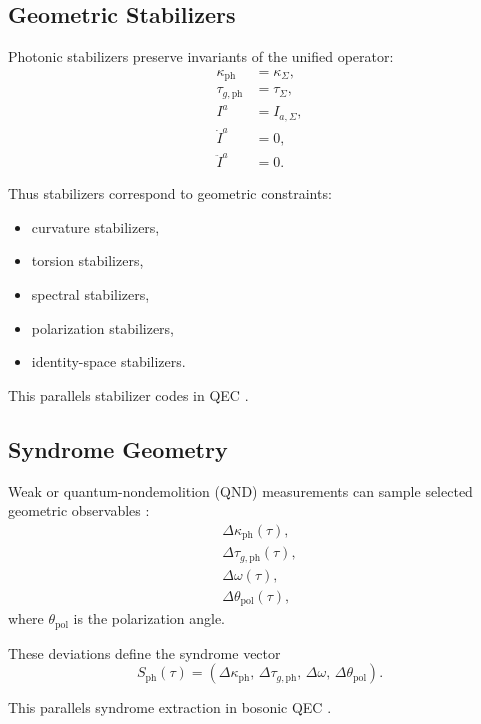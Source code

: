 \documentclass[aip,jmp,reprint,onecolumn,nofootinbib]{revtex4-2}
\begin{document}
\subsection{Geometric Stabilizers}

Photonic stabilizers preserve invariants of the unified operator:
\begin{align}
\kappa_{\mathrm{ph}} &= \kappa_{\Sigma}, \\
\tau_{g,\mathrm{ph}} &= \tau_{\Sigma}, \\
I^a &= I_{a,\Sigma}, \\
\dot{I}^a &= 0, \\
\ddot{I}^a &= 0.
\end{align}

Thus stabilizers correspond to geometric constraints:
\begin{itemize}
\item curvature stabilizers,
\item torsion stabilizers,
\item spectral stabilizers,
\item polarization stabilizers,
\item identity-space stabilizers.
\end{itemize}

This parallels stabilizer codes in QEC \cite{GottesmanQEC}.

\subsection{Syndrome Geometry}

Weak or quantum-nondemolition (QND) measurements can sample selected geometric 
observables \cite{QNDReview}:
\begin{align}
\Delta\kappa_{\mathrm{ph}}(\tau), \\
\Delta\tau_{g,\mathrm{ph}}(\tau), \\
\Delta\omega(\tau), \\
\Delta\theta_{\mathrm{pol}}(\tau),
\end{align}
where $\theta_{\mathrm{pol}}$ is the polarization angle.

These deviations define the syndrome vector
\begin{equation}
S_{\mathrm{ph}}(\tau)
=
\left(
\Delta\kappa_{\mathrm{ph}},\,
\Delta\tau_{g,\mathrm{ph}},\,
\Delta\omega,\,
\Delta\theta_{\mathrm{pol}}
\right).
\end{equation}

This parallels syndrome extraction in bosonic QEC \cite{PreskillQEC}.
\end{document}
